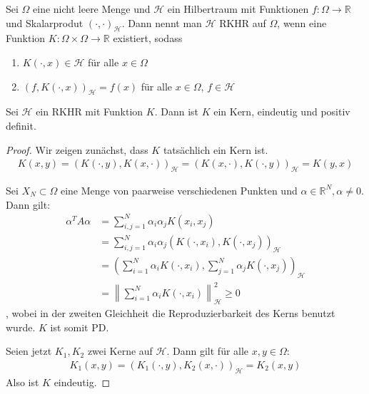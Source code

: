 \begin{definition}
Sei $\Omega$ eine nicht leere Menge und $\mathcal{H}$ ein Hilbertraum mit Funktionen $f:\Omega \rightarrow \mathbb{R}$ und Skalarprodut $(\cdot, \cdot)_\mathcal{H}$. Dann nennt man $\mathcal{H}$ \ac{RKHR} auf $\Omega$, wenn eine Funktion $K:\Omega \times \Omega \rightarrow \mathbb{R}$ existiert, sodass
\begin{enumerate}
\item $K(\cdot, x) \in \mathcal{H}$ für alle $x \in \Omega$
\item $(f, K(\cdot,x))_\mathcal{H} = f(x)$ für alle $ x \in \Omega$, $f \in \mathcal{H}$
\end{enumerate}
\end{definition}

\begin{theorem}
\label{thm:EindeutigkeitKern}
Sei $\mathcal{H}$ ein \ac{RKHR} mit Funktion $K$. Dann ist $K$ ein Kern, eindeutig und positiv definit.
\end{theorem}

\begin{proof}
Wir zeigen zunächst, dass $K$ tatsächlich ein Kern ist.
\begin{align*}
K(x,y) = \left( K(\cdot,y), K(x, \cdot)\right)_\mathcal{H} = \left(K(x,\cdot), K(\cdot,y)\right)_\mathcal{H} = K(y,x)
\end{align*}

Sei $X_N \subset \Omega$ eine Menge von paarweise verschiedenen Punkten und $\alpha \in \mathbb{R}^N, \alpha \neq 0$. Dann gilt:
\begin{align*}
\alpha^T A \alpha &= \sum_{i,j=1}^N \alpha_i \alpha_j K(x_i, x_j)\\
&= \sum_{i,j=1}^N \alpha_i \alpha_j \left(K(\cdot, x_i), K(\cdot,x_j)\right)_\mathcal{H}\\
&= \left(\sum_{i=1}^N \alpha_i K(\cdot,x_i), \sum_{j=1}^N \alpha_j K(\cdot, x_j)\right)_\mathcal{H}\\
&= \left\| \sum_{i=1}^N \alpha_i K(\cdot,x_i)\right\|_\mathcal{H}^2 \geq 0
\end{align*}
, wobei in der zweiten Gleichheit die Reproduzierbarkeit des Kerns benutzt wurde. $K$ ist somit \ac{PD}.

Seien jetzt $K_1, K_2$ zwei Kerne auf $\mathcal{H}$. Dann gilt für alle $x,y \in \Omega$:
\begin{align*}
K_1(x,y) = (K_1(\cdot,y), K_2(x, \cdot))_\mathcal{H} = K_2(x,y)
\end{align*}
Also ist $K$ eindeutig.
\end{proof}

